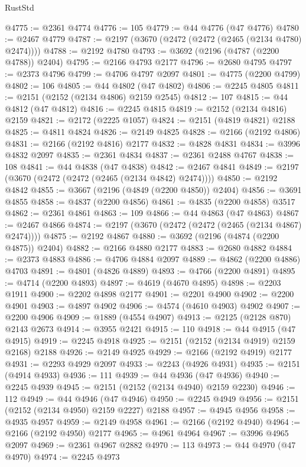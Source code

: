 \begin{lexlean}{RustStd}
\begin{coremodule}
@4775 := @2361 @4774
@4776 := 105
@4779 := @44 @4776 (@47 @4776)
@4780 := @2467 @4779
@4787 := @2197 (@3670 (@2472 (@2472 (@2465 (@2134 @4780) @2474))))
@4788 := @2192 @4780
@4793 := @3692 (@2196 (@4787 (@2200 @4788)) @2404)
@4795 := @2166 @4793 @2177
@4796 := @2680 @4795
@4797 := @2373 @4796
@4799 := @4706 @4797 @2097
@4801 := @4775 (@2200 @4799)
@4802 := 106
@4805 := @44 @4802 (@47 @4802)
@4806 := @2245 @4805
@4811 := @2151 (@2152 (@2134 @4806) @2159 @2545)
@4812 := 107
@4815 := @44 @4812 (@47 @4812)
@4816 := @2245 @4815
@4819 := @2152 (@2134 @4816) @2159
@4821 := @2172 (@2225 @1057)
@4824 := @2151 (@4819 @4821) @2188
@4825 := @4811 @4824
@4826 := @2149 @4825
@4828 := @2166 (@2192 @4806)
@4831 := @2166 (@2192 @4816) @2177
@4832 := @4828 @4831
@4834 := @3996 @4832 @2097
@4835 := @2361 @4834
@4837 := @2361 @2488 @4767
@4838 := 108
@4841 := @44 @4838 (@47 @4838)
@4842 := @2467 @4841
@4849 := @2197 (@3670 (@2472 (@2472 (@2465 (@2134 @4842) @2474))))
@4850 := @2192 @4842
@4855 := @3667 (@2196 (@4849 (@2200 @4850)) @2404)
@4856 := @3691 @4855
@4858 := @4837 (@2200 @4856)
@4861 := @4835 (@2200 @4858) @3517
@4862 := @2361 @4861
@4863 := 109
@4866 := @44 @4863 (@47 @4863)
@4867 := @2467 @4866
@4874 := @2197 (@3670 (@2472 (@2472 (@2465 (@2134 @4867) @2474))))
@4875 := @2192 @4867
@4880 := @3692 (@2196 (@4874 (@2200 @4875)) @2404)
@4882 := @2166 @4880 @2177
@4883 := @2680 @4882
@4884 := @2373 @4883
@4886 := @4706 @4884 @2097
@4889 := @4862 (@2200 @4886) @4703
@4891 := @4801 (@4826 @4889)
@4893 := @4766 (@2200 @4891)
@4895 := @4714 (@2200 @4893)
@4897 := @4619 (@4670 @4895)
@4898 := @2203 @1911
@4900 := @2202 @4898 @2177
@4901 := @2201 @4900
@4902 := @2200 @4901
@4903 := @4897 @4902
@4906 := @4574 (@4610 @4903) @4902
@4907 := @2200 @4906
@4909 := @1889 (@4554 @4907)
@4913 := @2125 (@2128 @870) @2143 @2673
@4914 := @3955 @2421
@4915 := 110
@4918 := @44 @4915 (@47 @4915)
@4919 := @2245 @4918
@4925 := @2151 (@2152 (@2134 @4919) @2159 @2168) @2188
@4926 := @2149 @4925
@4929 := @2166 (@2192 @4919) @2177
@4931 := @2293 @4929 @2097
@4933 := @2243 (@4926 @4931)
@4935 := @2151 (@4914 @4933)
@4936 := 111
@4939 := @44 @4936 (@47 @4936)
@4940 := @2245 @4939
@4945 := @2151 (@2152 (@2134 @4940) @2159 @2230)
@4946 := 112
@4949 := @44 @4946 (@47 @4946)
@4950 := @2245 @4949
@4956 := @2151 (@2152 (@2134 @4950) @2159 @2227) @2188
@4957 := @4945 @4956
@4958 := @4935 @4957
@4959 := @2149 @4958
@4961 := @2166 (@2192 @4940)
@4964 := @2166 (@2192 @4950) @2177
@4965 := @4961 @4964
@4967 := @3996 @4965 @2097
@4969 := @2361 @4967 @2882
@4970 := 113
@4973 := @44 @4970 (@47 @4970)
@4974 := @2245 @4973

\end{coremodule}
\end{lexlean}
